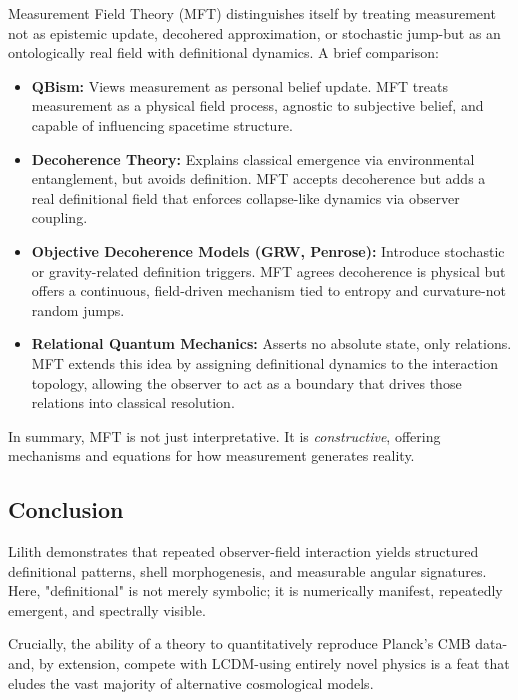 Measurement Field Theory (MFT) distinguishes itself by treating measurement not as epistemic update, decohered approximation, or stochastic jump-but as an ontologically real field with definitional dynamics. A brief comparison:

\begin{itemize}
  \item \textbf{QBism:} Views measurement as personal belief update. MFT treats measurement as a physical field process, agnostic to subjective belief, and capable of influencing spacetime structure.

  \item \textbf{Decoherence Theory:} Explains classical emergence via environmental entanglement, but avoids definition. MFT accepts decoherence but adds a real definitional field that enforces collapse-like dynamics via observer coupling.

  \item \textbf{Objective Decoherence Models (GRW, Penrose):} Introduce stochastic or gravity-related definition triggers. MFT agrees decoherence is physical but offers a continuous, field-driven mechanism tied to entropy and curvature-not random jumps.

  \item \textbf{Relational Quantum Mechanics:} Asserts no absolute state, only relations. MFT extends this idea by assigning definitional dynamics to the interaction topology, allowing the observer to act as a boundary that drives those relations into classical resolution.
\end{itemize}

In summary, MFT is not just interpretative. It is \textit{constructive}, offering mechanisms and equations for how measurement generates reality.


\subsection{Conclusion}
Lilith demonstrates that repeated observer-field interaction yields structured definitional patterns, shell morphogenesis, and measurable angular signatures. Here, "definitional" is not merely symbolic; it is numerically manifest, repeatedly emergent, and spectrally visible.

Crucially, the ability of a theory to quantitatively reproduce Planck's CMB data-and, by extension, compete with LCDM-using entirely novel physics is a feat that eludes the vast majority of alternative cosmological models.

